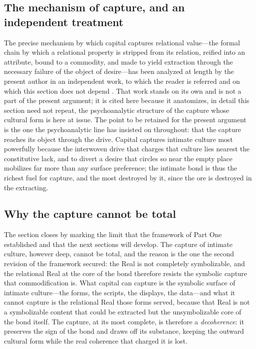 \subsection*{The mechanism of capture, and an independent treatment}

The precise mechanism by which capital captures relational value---the formal chain by which a relational property is stripped from its relation, reified into an attribute, bound to a commodity, and made to yield extraction through the necessary failure of the object of desire---has been analyzed at length by the present author in an independent work, to which the reader is referred and on which this section does not depend \parencite{wanhongrelationalvalue}. That work stands on its own and is not a part of the present argument; it is cited here because it anatomizes, in detail this section need not repeat, the psychoanalytic structure of the capture whose cultural form is here at issue. The point to be retained for the present argument is the one the psychoanalytic line has insisted on throughout: that the capture reaches its object through the drive. Capital captures intimate culture most powerfully because the interwoven drive that charges that culture lies nearest the constitutive lack, and to divert a desire that circles so near the empty place mobilizes far more than any surface preference; the intimate bond is thus the richest fuel for capture, and the most destroyed by it, since the ore is destroyed in the extracting.

\subsection*{Why the capture cannot be total}

The section closes by marking the limit that the framework of Part One established and that the next sections will develop. The capture of intimate culture, however deep, cannot be total, and the reason is the one the second revision of the framework secured: the Real is not completely symbolizable, and the relational Real at the core of the bond therefore resists the symbolic capture that commodification is. What capital can capture is the symbolic surface of intimate culture---the forms, the scripts, the displays, the data---and what it cannot capture is the relational Real those forms served, because that Real is not a symbolizable content that could be extracted but the unsymbolizable core of the bond itself. The capture, at its most complete, is therefore a \emph{decoherence}: it preserves the sign of the bond and draws off its substance, keeping the outward cultural form while the real coherence that charged it is lost.

